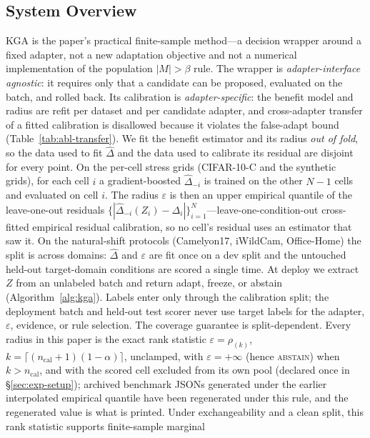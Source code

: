 

\subsection{System Overview}
\textsc{KGA} is the paper's practical finite-sample method---a decision wrapper around a fixed
adapter, not a new adaptation objective and not a numerical implementation of the population
$|M|>\beta$ rule. The wrapper is \emph{adapter-interface agnostic}: it requires only that a
candidate can be proposed, evaluated on the batch, and rolled back. Its calibration is
\emph{adapter-specific}: the benefit model and radius are refit per dataset and per candidate
adapter, and cross-adapter transfer of a fitted calibration is disallowed because it violates the
false-adapt bound (Table~\ref{tab:abl-transfer}). We fit the
benefit estimator and its radius \emph{out of fold}, so the data used to fit $\widehat\Delta$ and
the data used to calibrate its residual are disjoint for every point.
On the per-cell stress grids (CIFAR-10-C and the synthetic grids), for each cell $i$ a gradient-boosted
$\widehat\Delta_{-i}$ is trained on the other $N{-}1$ cells and evaluated on cell $i$. The radius
$\varepsilon$ is then an upper empirical quantile of the leave-one-out residuals
$\{|\widehat\Delta_{-i}(Z_i)-\Delta_i|\}_{i=1}^{N}$---leave-one-condition-out cross-fitted empirical
residual calibration, so no
cell's residual uses an estimator that saw it. On the natural-shift protocols (Camelyon17, iWildCam,
Office-Home) the split is across domains: $\widehat\Delta$ and $\varepsilon$ are fit once on a dev
split and the untouched held-out target-domain conditions are scored a single time. At deploy we
extract $Z$ from an unlabeled batch and return adapt, freeze, or abstain (Algorithm~\ref{alg:kga}).
Labels enter only through the calibration split; the deployment batch and held-out test scorer never
use target labels for the adapter, $\varepsilon$, evidence, or rule selection. The coverage
guarantee is split-dependent. Every radius in this paper is the exact rank statistic
$\varepsilon=\rho_{(k)}$, $k=\lceil(n_{\mathrm{cal}}{+}1)(1-\alpha)\rceil$, unclamped, with
$\varepsilon=+\infty$ (hence \textsc{abstain}) when $k>n_{\mathrm{cal}}$, and with the scored cell
excluded from its own pool
(declared once in \S\ref{sec:exp-setup}); archived benchmark JSONs generated under the earlier
interpolated empirical quantile have been regenerated under this rule, and the regenerated value is
what is printed.
Under exchangeability and a clean split, this rank statistic supports finite-sample marginal
